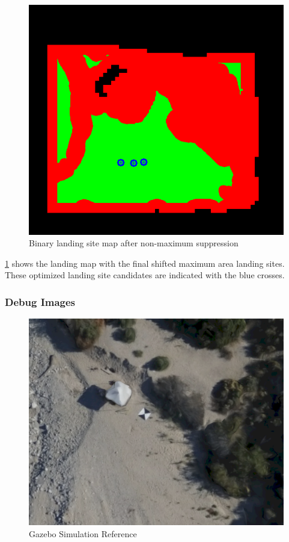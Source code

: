 \begin{figure}[ht!]
    \centering
    \includegraphics[scale=0.5]{images/system_overview/landing_map_marked.png}
    \caption{Binary landing site map after non-maximum suppression}
    \label{fig:ls_map_nps}
\end{figure}

\cref{fig:ls_map_nps} shows the landing map with the final shifted maximum area landing sites. These optimized landing site candidates are indicated with the blue crosses. 

\clearpage %

\subsubsection{Debug Images}

\begin{figure}[ht!]
    \centering
    \includegraphics[scale=0.25]{images/system_overview/lsd_debug_reference.png}
    \caption{Gazebo Simulation Reference}
    \label{fig:lsd_debug_ref}
\end{figure}

